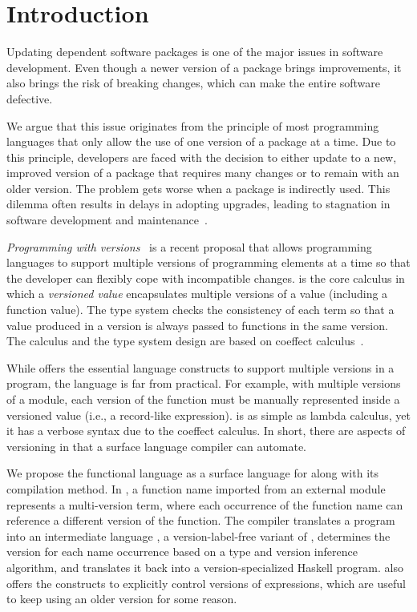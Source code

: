 \section{Introduction}
\label{introduction}
Updating dependent software packages is one of the major issues in software development. Even though a newer version of a package brings improvements, it also brings the risk of breaking changes, which can make the entire software defective.

We argue that this issue originates from the principle of most programming languages that only allow the use of one version of a package at a time. Due to this principle, developers are faced with the decision to either update to a new, improved version of a package that requires many changes or to remain with an older version. The problem gets worse when a package is indirectly used. This dilemma often results in delays in adopting upgrades, leading to stagnation in software development and maintenance~\cite{6676878,10.1007/s10664-014-9325-9}.

\emph{Programming with versions}~\cite{Tanabe:2018:CPA:3242921.3242923,Tanabe_2021,batakjava2022,bundling2023} is a recent proposal that allows programming languages to support multiple versions of programming elements at a time so that the developer can flexibly cope with incompatible changes. \corelang{} is the core calculus in which a \emph{versioned value} encapsulates multiple versions of a value (including a function value). The \corelang{} type system checks the consistency of each term so that a value produced in a version is always passed to functions in the same version. The calculus and the type system design are based on coeffect calculus~\cite{brunel_core_2014,Orchard:2019:Granule}.

While \corelang{} offers the essential language constructs to support multiple versions in a program, the language is far from practical. For example, with  multiple versions of a module, each version of the function must be manually represented inside a versioned value (i.e., a record-like expression). \corelang{} is as simple as lambda calculus, yet it has a verbose syntax due to the coeffect calculus. In short, there are aspects of versioning in \corelang{} that a surface language compiler can automate.

We propose the functional language \mylang{} as a surface language for \corelang{} along with its compilation method. In \mylang{}, a function name imported from an external module represents a multi-version term, where each occurrence of the function name can reference a different version of the function. The \mylang{} compiler translates a program into an intermediate language \vlmini{}, a version-label-free variant of \corelang{}, determines the version for each name occurrence based on a type and version inference algorithm, and translates it back into a version-specialized Haskell program.
\mylang{} also offers the constructs to explicitly control versions of expressions, which are useful to keep using an older version for some reason.  

